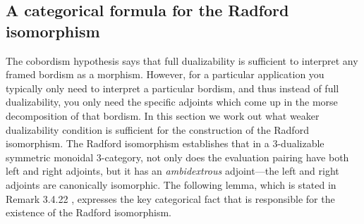\documentclass{amsart}
\begin{document}
\subsection{A categorical formula for the Radford isomorphism} 
The cobordism hypothesis says that full dualizability is sufficient to interpret any framed bordism as a morphism.  However, for a particular application you typically only need to interpret a particular bordism, and thus instead of full dualizability, you only need the specific adjoints which come up in the morse decomposition of that bordism.  In this section we work out what weaker dualizability condition is sufficient for the construction of the Radford isomorphism.    The Radford isomorphism establishes that in a 3-dualizable symmetric monoidal 3-category, not only does the evaluation pairing have both left and right adjoints, but it has an {\em ambidextrous} adjoint---the left and right adjoints are canonically isomorphic. 
The following lemma, which is stated in Remark 3.4.22 \cite{lurie-ch}, expresses the key categorical fact that is responsible for the existence of the Radford isomorphism. 
\end{document}

